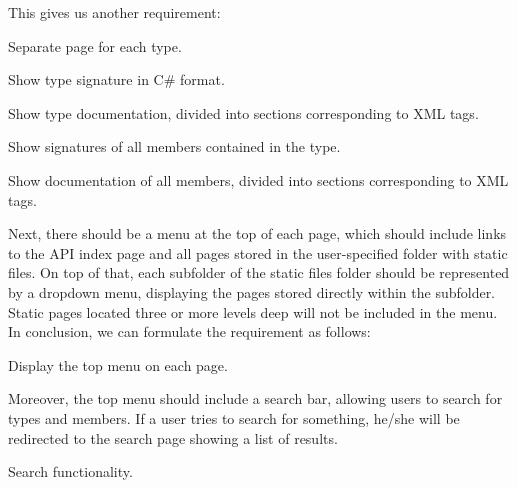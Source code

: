 This gives us another requirement:

\begin{requirement}
    Separate page for each type.
    \label{req:type-page}
\end{requirement}

\setcounter{subrequirementcounter}{10}
\setcounter{subrequirement}{0}

\begin{subrequirement}
    Show type signature in C\# format.
\end{subrequirement}

\begin{subrequirement}
    Show type documentation, divided into sections corresponding to XML tags.
\end{subrequirement}

\begin{subrequirement}
    Show signatures of all members contained in the type.
\end{subrequirement}

\begin{subrequirement}
    Show documentation of all members, divided into sections corresponding to XML tags.
\end{subrequirement}

Next, there should be a menu at the top of each page, which should include links to the API index page and all pages stored in the user-specified folder with static files.
On top of that, each subfolder of the static files folder should be represented by a dropdown menu, displaying the pages stored directly within the subfolder.
Static pages located three or more levels deep will not be included in the menu.
In conclusion, we can formulate the requirement as follows:

\begin{requirement}
    Display the top menu on each page.
    \label{req:top-menu}
\end{requirement}

Moreover, the top menu should include a search bar, allowing users to search for types and members.
If a user tries to search for something, he/she will be redirected to the search page showing a list of results.

\begin{requirement}
    Search functionality.
    \label{req:search}
\end{requirement}

\setcounter{subrequirementcounter}{12}
\setcounter{subrequirement}{0}

